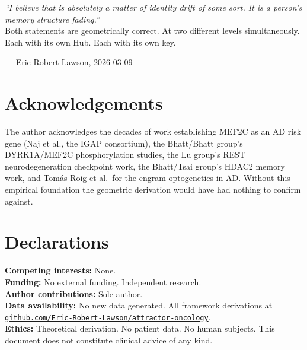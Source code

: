 \documentclass[12pt,a4paper]{article}
\begin{document}
\medskip\noindent\textit{``I believe that is absolutely
a matter of identity drift of some sort.
It is a person's memory structure fading.''}\\[4pt]
Both statements are geometrically correct.
At two different levels simultaneously.
Each with its own Hub.
Each with its own key.

\medskip\noindent\hfill--- Eric Robert Lawson, 2026-03-09

\section*{Acknowledgements}

The author acknowledges the decades of work establishing
MEF2C as an AD risk gene (Naj et al., the IGAP
consortium), the Bhatt/Bhatt group's DYRK1A/MEF2C
phosphorylation studies, the Lu group's REST
neurodegeneration checkpoint work, the Bhatt/Tsai
group's HDAC2 memory work, and Tomás-Roig et al.\ for
the engram optogenetics in AD. Without this empirical
foundation the geometric derivation would have had
nothing to confirm against.

\section*{Declarations}

\noindent\textbf{Competing interests:} None.\\
\textbf{Funding:} No external funding. Independent research.\\
\textbf{Author contributions:} Sole author.\\
\textbf{Data availability:} No new data generated.
All framework derivations at
\href{https://github.com/Eric-Robert-Lawson/attractor-oncology}%
{\texttt{github.com/Eric-Robert-Lawson/attractor-oncology}}.\\
\textbf{Ethics:} Theoretical derivation. No patient data.
No human subjects. This document does not constitute
clinical advice of any kind.
\end{document}
